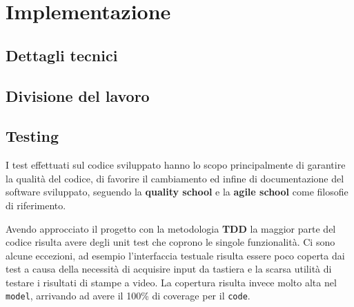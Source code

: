 \section{Implementazione}






\subsection{Dettagli tecnici} %





\subsection{Divisione del lavoro}
\subsection{Testing}
I test effettuati sul codice sviluppato hanno lo scopo principalmente di garantire la qualità del codice, di favorire il cambiamento ed infine di documentazione del software sviluppato, seguendo la \textbf{quality school} e la \textbf{agile school} come filosofie di riferimento.

Avendo approcciato il progetto con la metodologia \textbf{TDD} la maggior parte del codice risulta avere degli unit test che coprono le singole funzionalità.
%
Ci sono alcune eccezioni, ad esempio l'interfaccia testuale risulta essere poco coperta dai test a causa della necessità di acquisire input da tastiera e la scarsa utilità di testare i risultati di stampe a video.
%
La copertura risulta invece molto alta nel \texttt{model}, arrivando ad avere il 100\% di coverage per il \texttt{code}.

